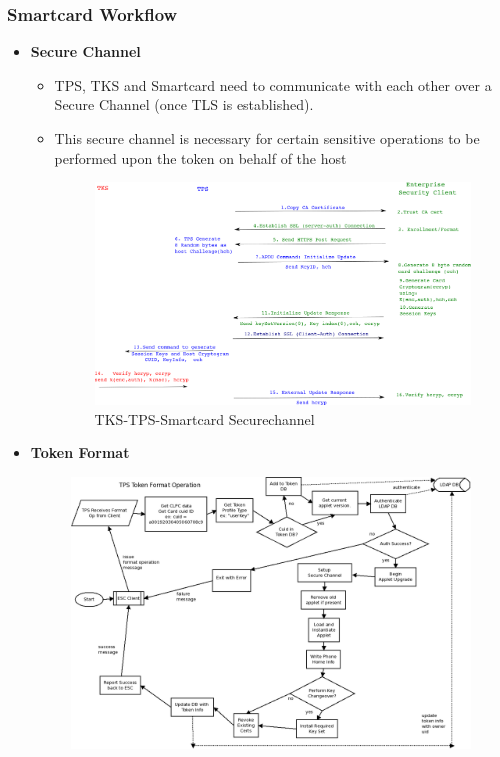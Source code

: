 \documentclass[a4paper]{article}
\begin{document}
\subsubsection{Smartcard Workflow}
    \begin{itemize}
        \item \textbf{Secure Channel}~\cite{RedHat:securechannel}
            \begin{itemize}
                \item TPS, TKS and Smartcard need to communicate with each other over a Secure Channel (once TLS is established).
                \item This secure channel is necessary for certain sensitive operations to be performed upon the token on behalf of the host
                    \begin{figure}[H]
                        \centering
                        \includegraphics[width=120mm]{tps-tks-smartcard-securechannel.png}
                        \caption{TKS-TPS-Smartcard Securechannel}
                    \end{figure}
            \end{itemize}
        \item \textbf{Token Format}
            \begin{figure}[H]
                \centering
                \includegraphics[width=120mm]{TPS_Format.png}

\end{figure}
\end{itemize}
\end{document}
